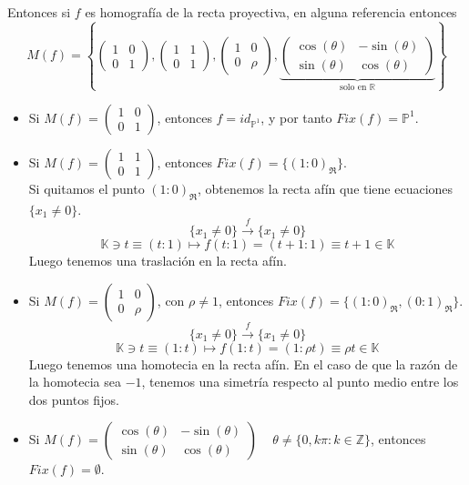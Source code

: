 Entonces si $f$ es homografía de la recta proyectiva, en alguna referencia entonces
\[  
    M(f) = \left\{ \begin{pmatrix}
        1 & 0 \\
        0 & 1
    \end{pmatrix}, \begin{pmatrix}
        1 & 1 \\
        0 & 1
    \end{pmatrix}, \begin{pmatrix}
        1 & 0 \\
        0 & \rho
    \end{pmatrix}, \underbrace{\begin{pmatrix}
        \cos(\theta) & -\sin(\theta) \\
        \sin(\theta) & \cos(\theta)
    \end{pmatrix}}_{\text{solo en } \mathbb{R}} \right\}
\]

\begin{itemize}
    \item Si $M(f) = \begin{pmatrix}
        1 & 0 \\
        0 & 1
    \end{pmatrix}$, entonces $f = id_{\mathbb{P}^1}$, y por tanto $Fix(f) = \mathbb{P}^1$.
    \item Si $M(f) = \begin{pmatrix}
        1 & 1 \\
        0 & 1
    \end{pmatrix}$, entonces $Fix(f) = \{(1:0)_\mathfrak{R}\}$.\\
    Si quitamos el punto $(1:0)_\mathfrak{R}$, obtenemos la recta afín que tiene ecuaciones $\{x_1 \neq 0\}$.
    \[
        \{x_1 \neq 0\} \xrightarrow{f} \{x_1 \neq 0\}
    \]
    \[
        \mathbb{K} \owns t \equiv (t:1) \mapsto f(t:1) = (t+1:1) \equiv t + 1 \in \mathbb{K}
    \]
    Luego tenemos una traslación en la recta afín.
    \item Si $M(f) = \begin{pmatrix}
        1 & 0 \\
        0 & \rho
    \end{pmatrix}$, con $\rho \neq 1$, entonces $Fix(f) = \{(1:0)_\mathfrak{R}, (0:1)_\mathfrak{R}\}$.\\
    \[
        \{x_1 \neq 0\} \xrightarrow{f} \{x_1 \neq 0\}
    \]
    \[
        \mathbb{K} \owns t \equiv (1:t) \mapsto f(1:t) = (1:\rho t) \equiv \rho t \in \mathbb{K}
    \]
    Luego tenemos una homotecia en la recta afín. En el caso de que la razón de la homotecia sea $-1$, tenemos una simetría respecto al punto medio entre los dos puntos fijos.
    \item Si $M(f) = \begin{pmatrix}
        \cos(\theta) & -\sin(\theta) \\
        \sin(\theta) & \cos(\theta)
    \end{pmatrix}\, \quad \theta \neq \{0, k\pi : k \in \mathbb{Z} \}$, entonces $Fix(f) = \emptyset$.\\
\end{itemize}

